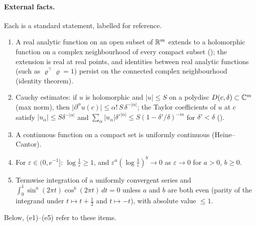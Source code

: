 \paragraph{External facts.} Each is a standard statement, labelled for reference.
\begin{enumerate}[label=(e\arabic*),ref=(e\arabic*)]
\item\label{bpP:p11:e1} A real analytic function on an open subset of $\mathbb{R}^m$ extends to a holomorphic function on a complex neighbourhood of every compact subset (); the extension is real at real points, and identities between real analytic functions (such as $\varrho^\top\varrho=1$) persist on the connected complex neighbourhood (identity theorem).
\item\label{bpP:p11:e2} Cauchy estimates: if $u$ is holomorphic and $\lvert u\rvert\le S$ on a polydisc $D(c,\delta)\subset\mathbb{C}^m$ (max norm), then $\lvert\partial^\alpha u(c)\rvert\le\alpha!\,S\,\delta^{-\lvert\alpha\rvert}$; the Taylor coefficients of $u$ at $c$ satisfy $\lvert u_\alpha\rvert\le S\delta^{-\lvert\alpha\rvert}$ and $\sum_\alpha\lvert u_\alpha\rvert\delta'^{\lvert\alpha\rvert}\le S(1-\delta'/\delta)^{-m}$ for $\delta'<\delta$ ().
\item\label{bpP:p11:e3} A continuous function on a compact set is uniformly continuous (Heine--Cantor).
\item\label{bpP:p11:e4} For $\varepsilon\in(0,e^{-1}]$: $\log\frac1\varepsilon\ge1$, and $\varepsilon^{a}(\log\frac1\varepsilon)^b\to0$ as $\varepsilon\to0$ for $a>0$, $b\ge0$.
\item\label{bpP:p11:e5} Termwise integration of a uniformly convergent series and $\int_0^1\sin^a(2\pi t)\cos^b(2\pi t)\,dt=0$ unless $a$ and $b$ are both even (parity of the integrand under $t\mapsto t+\frac12$ and $t\mapsto-t$), with absolute value $\le1$.
\end{enumerate}
Below, (e1)--(e5) refer to these items.

